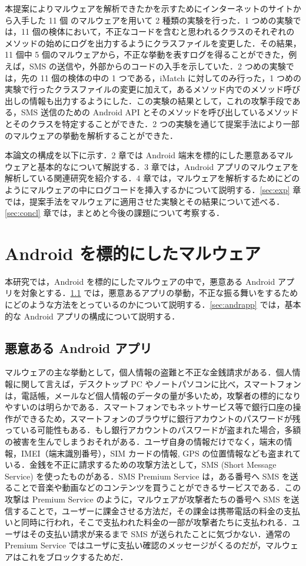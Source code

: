 \documentclass[12pt]{jsarticle}
\begin{document}
本提案によりマルウェアを解析できたかを示すためにインターネットのサイトから入手した 11 個 のマルウェアを用いて 2 種類の実験を行った．1 つめの実験では，11 個の検体において，不正なコードを含むと思われるクラスのそれぞれのメソッドの始めにログを出力するようにクラスファイルを変更した．その結果，11 個中 5 個のマルウェアから，不正な挙動を表すログを得ることができた，例えば，SMS の送信や，外部からのコードの入手を示していた．2 つめの実験では，先の 11 個の検体の中の 1 つである，iMatch に対してのみ行った，1 つめの実験で行ったクラスファイルの変更に加えて，あるメソッド内でのメソッド呼び出しの情報も出力するようにした．この実験の結果として，これの攻撃手段である，SMS 送信のための Android API とそのメソッドを呼び出しているメソッドとそのクラスを特定することができた．2 つの実験を通じて提案手法により一部のマルウェアの挙動を解析することができた．

本論文の構成を以下に示す．2 章では Android 端末を標的にした悪意あるマルウェアと基本的なについて解説する．3 章では，Android アプリのマルウェアを解析している関連研究を紹介する．4 章では，マルウェアを解析するためにどのようにマルウェアの中にログコードを挿入するかについて説明する．\ref{sec:exp} 章では，提案手法をマルウェアに適用させた実験とその結果について述べる．\ref{sec:concl} 章では，まとめと今後の課題について考察する．

\newpage

\section{Android  を標的にしたマルウェア}
本研究では，Android を標的にしたマルウェアの中で，悪意ある Android アプリを対象とする．\ref{sec:malware} では，悪意あるアプリの挙動，不正な振る舞いをするためにどのような方法をとっているのかについて説明する．\ref{sec:andrapp} では，基本的な Android アプリの構成について説明する．
\subsection{悪意ある Android  アプリ}
\label{sec:malware}
マルウェアの主な挙動として，個人情報の盗難と不正な金銭請求がある．個人情報に関して言えば，デスクトップ PC やノートパソコンに比べ，スマートフォンは，電話帳，メールなど個人情報のデータの量が多いため，攻撃者の標的になりやすいのは明らかである．スマートフォンでもネットサービス等で銀行口座の操作ができるため，スマートフォンのブラウザに銀行アカウントのパスワードが残っている可能性もある．もし銀行アカウントのパスワードが盗まれた場合，多額の被害を生んでしまうおそれがある．ユーザ自身の情報だけでなく，端末の情報，IMEI（端末識別番号），SIM カードの情報, GPS の位置情報なども盗まれている．金銭を不正に請求するための攻撃方法として，SMS (Short Message Service) を使ったものがある．SMS Premium Service は，ある番号へ SMS を送ることで音楽や動画などのコンテンツを買うことができるサービスである．この攻撃は Premium Service のように，マルウェアが攻撃者たちの番号へ SMS を送信することで，ユーザーに課金させる方法だ，その課金は携帯電話の料金の支払いと同時に行われ，そこで支払われた料金の一部が攻撃者たちに支払われる．ユーザはその支払い請求が来るまで SMS が送られたことに気づかない．通常の Premium Service ではユーザに支払い確認のメッセージがくるのだが，マルウェアはこれをブロックするためだ．
\end{document}
